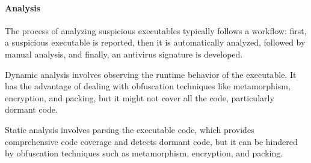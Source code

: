 \paragraph*{Analysis}
The process of analyzing suspicious executables typically follows a workflow: first, a suspicious executable is reported, then it is automatically analyzed, followed by manual analysis, and finally, an antivirus signature is developed.

Dynamic analysis involves observing the runtime behavior of the executable. 
It has the advantage of dealing with obfuscation techniques like metamorphism, encryption, and packing, but it might not cover all the code, particularly dormant code.

Static analysis involves parsing the executable code, which provides comprehensive code coverage and detects dormant code, but it can be hindered by obfuscation techniques such as metamorphism, encryption, and packing.
